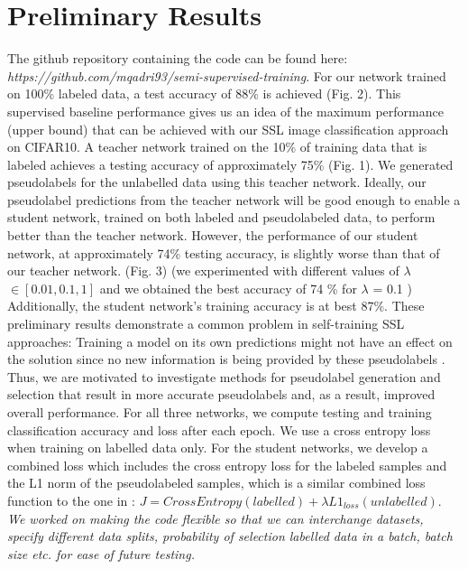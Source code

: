 \documentclass{article}
\begin{document}
\section{Preliminary Results}
The github repository containing the code can be found here: \textit{https://github.com/mqadri93/semi-supervised-training}.
For our network trained on 100\% labeled data, a test accuracy of 88\% is achieved (Fig. 2). This supervised baseline performance gives us an idea of the maximum performance (upper bound) that can be achieved with our SSL image classification approach on CIFAR10. A teacher network trained on the 10\% of training data that is labeled achieves a testing accuracy of approximately 75\% (Fig. 1). We generated pseudolabels for the unlabelled data using this teacher network. Ideally, our pseudolabel predictions from the teacher network will be good enough to enable a student network, trained on both labeled and pseudolabeled data, to perform better than the teacher network. However, the performance of our student network, at approximately 74\% testing accuracy, is slightly worse than that of our teacher network. (Fig. 3) (we experimented with different values of $\lambda$ $\in [0.01, 0.1, 1]$ and we obtained the best accuracy of 74 \% for $\lambda$ = 0.1 ) Additionally, the student network's training accuracy is at best 87\%. These preliminary results demonstrate a common problem in self-training SSL approaches: Training a model on its own predictions might not have an effect on the solution since no new information is being provided by these pseudolabels \cite{Radosavovic_2018_CVPR}. Thus, we are motivated to investigate methods for pseudolabel generation and selection that result in more accurate pseudolabels and, as a result, improved overall performance. For all three networks, we compute testing and training classification accuracy and loss after each epoch. We use a cross entropy loss when training on labelled data only. For the student networks, we develop a combined loss which includes the cross entropy loss for the labeled samples and the L1 norm of the pseudolabeled samples, which is a similar combined loss function to the one in \cite{Berthelot2019MixMatch:Learning}: $J = CrossEntropy(labelled) + \lambda L1_{loss}(unlabelled)$.
\textit{We worked on making the code flexible so that we can interchange datasets, specify different data splits, probability of selection labelled data in a batch, batch size etc. for ease of future testing.}
\end{document}
